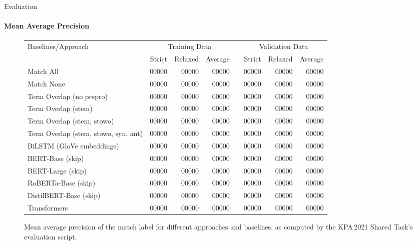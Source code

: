 \documentclass[english,handout]{mlutalk}
\begin{document}
\begin{frame}{Evaluation}
  \framesubtitle{Mean Average Precision}
  \begin{figure}
    \centering
    \caption{Mean average precision of the match label for different approaches and baselines, as computed by the KPA\,2021 Shared Task's evaluation script.}
    \tiny
    \begin{tabular}{lrrrlrrr}
      \toprule
      Baselines/Approach & \multicolumn{3}{c}{Training Data} & & \multicolumn{3}{c}{Validation Data}\\ \cline{2-4} \cline{6-8}
        & Strict & Relaxed & Average & & Strict & Relaxed & Average\\
      \midrule
      Match All                           & 00000 & 00000 & 00000 & & 00000 & 00000 & 00000\\
      Match None                          & 00000 & 00000 & 00000 & & 00000 & 00000 & 00000\\
      Term Overlap (no prepro)            & 00000 & 00000 & 00000 & & 00000 & 00000 & 00000\\
      Term Overlap (stem)                 & 00000 & 00000 & 00000 & & 00000 & 00000 & 00000\\
      Term Overlap (stem, stowo)          & 00000 & 00000 & 00000 & & 00000 & 00000 & 00000\\
      Term Overlap (stem, stowo, syn, ant)& 00000 & 00000 & 00000 & & 00000 & 00000 & 00000\\
      \midrule
      BiLSTM (GloVe embeddings)           & 00000 & 00000 & 00000 & & 00000 & 00000 & 00000\\
      BERT-Base (skip)                    & 00000 & 00000 & 00000 & & 00000 & 00000 & 00000\\
      BERT-Large (skip)                   & 00000 & 00000 & 00000 & & 00000 & 00000 & 00000\\
      RoBERTa-Base (skip)                 & 00000 & 00000 & 00000 & & 00000 & 00000 & 00000\\
      DistilBERT-Base (skip)              & 00000 & 00000 & 00000 & & 00000 & 00000 & 00000\\
      Transformers                        & 00000 & 00000 & 00000 & & 00000 & 00000 & 00000\\
      \bottomrule
    \end{tabular}
  \end{figure}
\end{frame}
\end{document}
